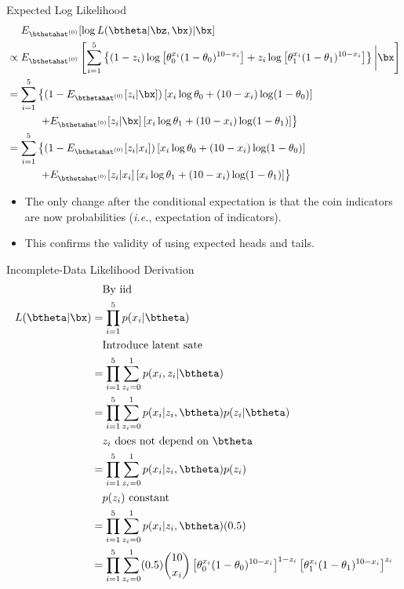 \documentclass[dvipdfmx,bigger,aspectratio=169]{beamer}
\begin{document}
\begin{frame}[allowframebreaks,label=,t]{Expected Log Likelihood}
\begin{align*}
\label{eq:org95116d1}
  &~~~~E_{\bthetahat^{(0)}}[\log L(\btheta | \bz,\bx) | \bx]\\
  &\propto E_{\bthetahat^{(0)}} \left[ \sum^{5}_{i=1}
    \left\{
    (1-z_{i}) \log \left[ \theta_{0}^{x_{i}}(1-\theta_{0})^{10-x_{i}} \right] +
    z_{i} \log \left[ \theta_{1}^{x_{i}}(1-\theta_{1})^{10-x_{i}} \right]
    \right\} \bigg| \bx \right]\\
  &= \sum^{5}_{i=1}
    \left\{
    (1- E_{\bthetahat^{(0)}}[z_{i} | \bx]) \left[ x_{i}\log\theta_{0} + (10-x_{i})\log(1-\theta_{0})\right]
    \right.\\
  &~~~~~~~~~ \left.
    + E_{\bthetahat^{(0)}}[z_{i} | \bx] \left[ x_{i}\log\theta_{1} + (10-x_{i})\log(1-\theta_{1})\right]
    \right\}\\
  &= \sum^{5}_{i=1}
    \left\{
    (1- E_{\bthetahat^{(0)}}[z_{i} | x_{i}]) \left[ x_{i}\log\theta_{0} + (10-x_{i})\log(1-\theta_{0})\right]
    \right.\\
  &~~~~~~~~~ \left.
    + E_{\bthetahat^{(0)}}[z_{i} | x_{i}] \left[ x_{i}\log\theta_{1} + (10-x_{i})\log(1-\theta_{1})\right]
    \right\}
\end{align*}
\begin{itemize}
\item The only change after the conditional expectation is that the coin indicators are now probabilities (\textit{i.e.}, expectation of indicators).
\item This confirms the validity of using expected heads and tails.
\end{itemize}
\end{frame}

\begin{frame}[allowframebreaks,label=,t]{Incomplete-Data Likelihood Derivation}
\begin{align*}
\label{eq:org7f6205f}
  &~~~\text{By iid}\\
  L(\btheta | \bx)
  &= \prod^{5}_{i=1}p(x_{i} | \btheta)\\
  &~~~\text{Introduce latent sate}\\
  &= \prod^{5}_{i=1} \sum^{1}_{z_{i}=0} p(x_{i}, z_{i} | \btheta)\\
  &= \prod^{5}_{i=1} \sum^{1}_{z_{i}=0} p(x_{i} | z_{i}, \btheta) p(z_{i} | \btheta)\\
  &~~~\text{$z_{i}$ does not depend on $\btheta$}\\
  &= \prod^{5}_{i=1} \sum^{1}_{z_{i}=0} p(x_{i} | z_{i}, \btheta) p(z_{i})\\
  &~~~\text{$p(z_{i})$ constant}\\
  &= \prod^{5}_{i=1} \sum^{1}_{z_{i}=0} p(x_{i} | z_{i}, \btheta) (0.5)\\
  &= \prod^{5}_{i=1} \sum^{1}_{z_{i}=0}
    (0.5) \binom{10}{x_{i}}
    \left[ \theta_{0}^{x_{i}}(1-\theta_{0})^{10-x_{i}} \right]^{1-z_{i}}
    \left[ \theta_{1}^{x_{i}}(1-\theta_{1})^{10-x_{i}} \right]^{z_{i}}\\
\end{align*}
\end{frame}
\end{document}
